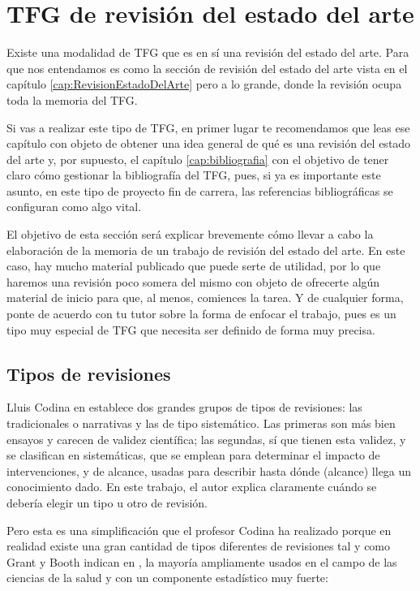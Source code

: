 \section{TFG de revisión del estado del arte}
\label{appendix:revisionestado}

Existe una modalidad de TFG que es en sí una revisión del estado del arte. Para que nos entendamos es como la sección de revisión del estado del arte vista en el capítulo \ref{cap:RevisionEstadoDelArte} pero a lo grande, donde la revisión ocupa toda la memoria del TFG.

Si vas a realizar este tipo de TFG, en primer lugar te recomendamos que leas ese capítulo con objeto de obtener una idea general de qué es una revisión del estado del arte y, por supuesto, el capítulo \ref{cap:bibliografia} con el objetivo de tener claro cómo gestionar la bibliografía del TFG, pues, si ya es importante este asunto, en este tipo de proyecto fin de carrera, las referencias bibliográficas se configuran como algo vital.

El objetivo de esta sección será explicar brevemente cómo llevar a cabo la elaboración de la memoria de un trabajo de revisión del estado del arte. En este caso, hay mucho material publicado que puede serte de utilidad, por lo que haremos una revisión poco somera del mismo con objeto de ofrecerte algún material de inicio para que, al menos, comiences la tarea. Y de cualquier forma, ponte de acuerdo con tu tutor sobre la forma de enfocar el trabajo, pues es un tipo muy especial de TFG que necesita ser definido de forma muy precisa.

\subsection{Tipos de revisiones}

Lluis Codina en \cite{codina2024lluis} establece dos grandes grupos de tipos de revisiones: las tradicionales o narrativas y las de tipo sistemático. Las primeras son más bien ensayos y carecen de validez científica; las segundas, sí que tienen esta validez, y se clasifican en sistemáticas, que se emplean para determinar el impacto de intervenciones, y de alcance, usadas para describir hasta dónde (alcance) llega un conocimiento dado. En este trabajo, el autor explica claramente cuándo se debería elegir un tipo u otro de revisión.

Pero esta es una simplificación que el profesor Codina ha realizado porque en realidad existe una gran cantidad de tipos diferentes de revisiones tal y como Grant y Booth indican en \cite{grant2009maria}, la mayoría ampliamente usados en el campo de las ciencias de la salud y con un componente estadístico muy fuerte:


